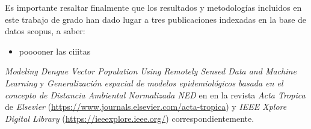   \par Es importante resaltar finalmente que los resultados y metodologías
    incluidos en este trabajo de grado han dado lugar a tres publicaciones
    indexadas en la base de datos scopus, a saber:

    \begin{itemize}
      \item pooooner las ciiitas
    \end{itemize}
    \textit{Modeling Dengue Vector Population Using Remotely Sensed Data and
    Machine Learning} \cite{scavuzzo2018modeling} y
    \textit{Generalización espacial de modelos epidemiológicos basada en el
    concepto de Distancia Ambiental Normalizada NED} en
    en la revista \textit{Acta Tropica}
    de \textit{Elsevier} (\url{https://www.journals.elsevier.com/acta-tropica})
    y \textit{IEEE Xplore Digital Library} (\url{https://ieeexplore.ieee.org/})
    correspondientemente.
%
